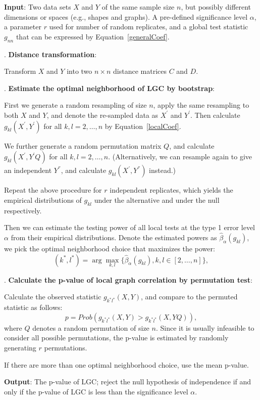 \documentclass[11pt]{article}
\begin{document}
\begin{algorithm}
\label{alg1}
\begin{algorithmic} 
\State \textbf{Input}: Two data sets $X$ and $Y$ of the same sample size $n$, but possibly different dimensions or spaces (e.g., shapes and graphs). A pre-defined significance level $\alpha$, a parameter $r$ used for number of random replicates, and a global test statistic $g_{nn}$ that can be expressed by Equation~\ref{generalCoef}. 

. \textbf{Distance transformation}:

Transform $X$ and $Y$ into two $n \times n$ distance matrices $C$ and $D$. 

. \textbf{Estimate the optimal neighborhood of LGC by bootstrap}:

First we generate a random resampling of size $n$, apply the same resampling to both $X$ and $Y$, and denote the re-sampled data as $X^{'}$ and $Y^{'}$. Then calculate $g_{kl}(X^{'}, Y^{'})$ for all $k,l=2,\ldots,n$ by Equation~\eqref{localCoef}. 

We further generate a random permutation matrix $Q$, and calculate $g_{kl}(X^{'}, Y^{'}Q)$ for all $k,l=2,\ldots,n$. (Alternatively, we can resample again to give an independent $Y^{''}$, and calculate $g_{kl}(X^{'}, Y^{''})$ instead.)

Repeat the above procedure for $r$ independent replicates, which yields the empirical distributions of $g_{kl}$ under the alternative and under the null respectively. 

Then we can estimate the testing power of all local tests at the type 1 error level $\alpha$ from their empirical distributions. Denote the estimated powers as $\hat{\beta}_{\alpha}(g_{kl})$, we pick the optimal neighborhood choice that maximizes the power:
\begin{equation}
\label{power}
(k^{*},l^{*})=\arg\max_{k,l}\{\hat{\beta}_{\alpha}(g_{kl}), k,l\in [2,\ldots,n]\},
\end{equation}

. \textbf{Calculate the p-value of local graph correlation by permutation test}: 

Calculate the observed statistic $g_{k^{*}l^{*}}(X, Y)$, and compare to the permuted statistic as follows:
\begin{equation}
\label{pvalue}
p=Prob(g_{k^{*}l^{*}}(X, Y)>g_{k^{*}l^{*}}(X, YQ)),
\end{equation}
where $Q$ denotes a random permutation of size $n$. Since it is usually infeasible to consider all possible permutations, the p-value is estimated by randomly generating $r$ permutations.

If there are more than one optimal neighborhood choice, use the mean p-value.

\State \textbf{Output}: The p-value of LGC; reject the null hypothesis of independence if and only if the p-value of LGC is less than the significance level $\alpha$.
\end{algorithmic} 
\end{algorithm} 
\end{document}
